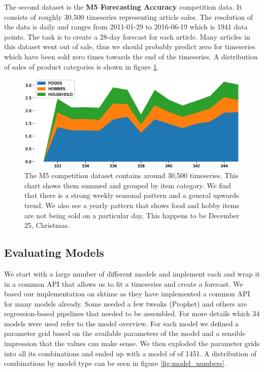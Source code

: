 The second dataset is the \textbf{M5 Forecasting Accuracy} competition \cite{M5} data. It consists of roughly 30,500 timeseries representing article sales. The resolution of the data is daily and ranges from 2011-01-29 to 2016-06-19 which is 1941 data points. The task is to create a 28-day forecast for each article. Many articles in this dataset went out of sale, thus we should probably predict zero for timeseries which have been sold zero times towards the end of the timeseries. A distribution of sales of product categories is shown in figure \ref{fig:m5_cat_distribution}.


\begin{figure}
\centerline{\includegraphics[scale=.6]{Figures/m5_cat_distribution.eps}}
\caption{The M5 competition dataset contains around 30,500 timeseries. This chart shows them summed and grouped by item category. We find that there is a strong weekly seasonal pattern and a general upwards trend. We also see a yearly pattern that shows food and hobby items are not being sold on a particular day. This happens to be December 25, Christmas.}
\label{fig:m5_cat_distribution}
\end{figure}


\subsection{Evaluating Models}

We start with a large number of different models and implement each and wrap it in a common API that allows us to fit a timeseries and create a forecast. We based our implementation on sktime \cite{sktime} as they have implemented a common API for many models already. Some needed a few tweaks (Prophet) and others are regression-based pipelines that needed to be assembled. For more details which 34 models were used refer to the model overview. For each model we defined a parameter grid based on the available parameters of the model and a sensible impression that the values can make sense. We then exploded the parameter grids into all its combinations and ended up with a model of of 1451. A distribution of combinations by model type can be seen in figure \ref{fig:model_numbers}.


